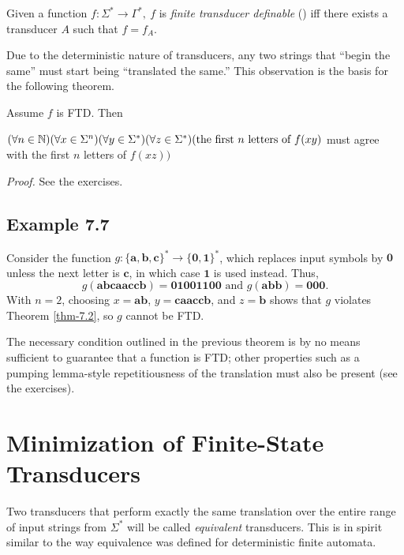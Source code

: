 \begin{dfn}\label{dfn-7.4}
Given a function $f$$: \Sigma^* \rightarrow \Gamma^*,\ f$ is \emph{finite transducer definable} () iff there exists a transducer $A$ such
that $f=f_A$.
\end{dfn}

Due to the deterministic nature of transducers, any two strings that ``begin
the same'' must start being ``translated the same.'' This observation is the
basis for the following theorem.

\begin{thm}\label{thm-7.2}
Assume $f$ is FTD. Then

$(\forall n \in \mathbb{N})(\forall x \in \Sigma^n)(\forall y \in \Sigma^*)
	(\forall z \in \Sigma^*)(\text{the first }n\text{ letters of }f(xy)$
	must agree with the first $n$ letters of $f(xz))$

\emph{Proof.} See the exercises.
\end{thm}

\subsection*{Example 7.7}

Consider the function $g$$:\{\pmb{a},\pmb{b},\pmb{c}\}^* \rightarrow
\{\pmb{0},\pmb{1}\}^*$, which replaces input symbols by $\pmb{0}$ unless the
next letter is $\pmb{c}$, in which case $\pmb{1}$ is used instead. Thus,
\[ g(\pmb{abcaaccb}) = \pmb{01001100}\text{ and }g(\pmb{abb}) = \pmb{000}. \]
With $n = 2$, choosing $x = \pmb{ab}$, $y = \pmb{caaccb}$, and $z = \pmb{b}$
shows that $g$ violates Theorem \ref{thm-7.2}, so $g$ cannot be FTD.

The necessary condition outlined in the previous theorem is by no means
sufficient to guarantee that a function is FTD; other properties such as a
pumping lemma-style repetitiousness of the translation must also be present (see
the exercises).

\section{Minimization of Finite-State Transducers}\label{sec-7.2}

Two transducers that perform exactly the same translation over the entire range
of input strings from $\Sigma^*$ will be called \emph{equivalent} transducers.
This is in spirit similar to the way equivalence was defined for deterministic
finite automata.

